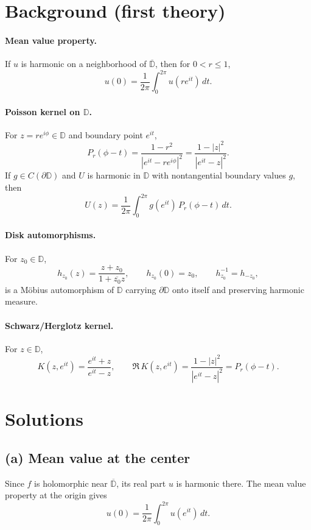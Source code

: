 \documentclass[11pt]{article}
\begin{document}
	\section*{Background (first theory)}
	\paragraph{Mean value property.}
	If $u$ is harmonic on a neighborhood of $\overline{\mathbb D}$, then for $0<r\le 1$,
	\[
	u(0)=\frac{1}{2\pi}\int_{0}^{2\pi}u(re^{it})\,dt.
	\]
	
	\paragraph{Poisson kernel on $\mathbb D$.}
	For $z=re^{i\phi}\in\mathbb D$ and boundary point $e^{it}$,
	\[
	P_r(\phi-t)=\frac{1-r^{2}}{|e^{it}-re^{i\phi}|^{2}}
	=\frac{1-|z|^{2}}{|e^{it}-z|^{2}}.
	\]
	If $g\in C(\partial\mathbb D)$ and $U$ is harmonic in $\mathbb D$ with nontangential boundary values $g$, then
	\[
	U(z)=\frac{1}{2\pi}\int_{0}^{2\pi} g(e^{it})\,P_r(\phi-t)\,dt .
	\]
	
	\paragraph{Disk automorphisms.}
	For $z_0\in\mathbb D$,
	\[
	h_{z_0}(z)=\frac{z+z_0}{1+\overline{z_0}z},\qquad
	h_{z_0}(0)=z_0,\qquad h_{z_0}^{-1}=h_{-z_0},
	\]
	is a Möbius automorphism of $\mathbb D$ carrying $\partial\mathbb D$ onto itself and preserving harmonic measure.
	
	\paragraph{Schwarz/Herglotz kernel.}
	For $z\in\mathbb D$,
	\[
	K(z,e^{it})=\frac{e^{it}+z}{e^{it}-z},\qquad
	\Re\,K(z,e^{it})=\frac{1-|z|^{2}}{|e^{it}-z|^{2}}=P_r(\phi-t).
	\]
	
	\section*{Solutions}
	
	\subsection*{(a) Mean value at the center}
	Since $f$ is holomorphic near $\overline{\mathbb D}$, its real part $u$ is harmonic there. The mean value property at the origin gives
	\[
	u(0)=\frac{1}{2\pi}\int_{0}^{2\pi}u(e^{it})\,dt.
	\]
	
\end{document}
